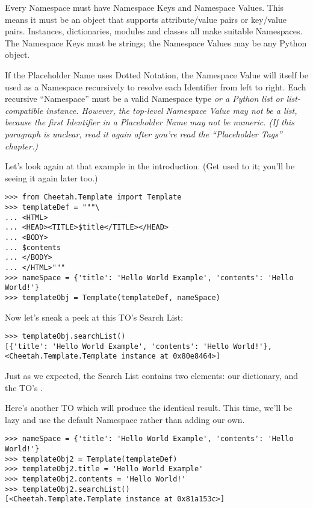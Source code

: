 
Every Namespace must have Namespace Keys and Namespace Values.  This means it
must be an object that supports attribute/value pairs or key/value pairs.  
Instances, dictionaries, modules and classes all make suitable Namespaces.
The Namespace Keys must be strings; the Namespace Values may be any Python
object.

If the Placeholder Name uses Dotted Notation, the Namespace Value will itself
be used as a Namespace recursively to resolve each Identifier from left to 
right.  Each recursive ``Namespace'' must be a valid Namespace type 
\em{or} a Python list or list-compatible instance.  However, the top-level
Namespace Value may \em{not} be a list, because the first Identifier in a
Placeholder Name may not be numeric.  (If this paragraph is unclear, read it
again after you're read the ``Placeholder Tags'' chapter.)

Let's look again at that example in the introduction.  (Get used to it; you'll
be seeing it again later too.)

\begin{verbatim}
>>> from Cheetah.Template import Template
>>> templateDef = """\
... <HTML>
... <HEAD><TITLE>$title</TITLE></HEAD>
... <BODY>
... $contents
... </BODY>
... </HTML>"""
>>> nameSpace = {'title': 'Hello World Example', 'contents': 'Hello World!'}
>>> templateObj = Template(templateDef, nameSpace)
\end{verbatim}

Now let's sneak a peek at this TO's Search List:

\begin{verbatim}
>>> templateObj.searchList()
[{'title': 'Hello World Example', 'contents': 'Hello World!'}, 
<Cheetah.Template.Template instance at 0x80e8464>]
\end{verbatim}

Just as we expected, the Search List contains two elements: our 
\code{nameSpace} dictionary, and the TO's \code{self}.

Here's another TO which will produce the identical result.  This time, we'll be
lazy and use the default Namespace rather than adding our own.

\begin{verbatim}
>>> nameSpace = {'title': 'Hello World Example', 'contents': 'Hello World!'}
>>> templateObj2 = Template(templateDef)
>>> templateObj2.title = 'Hello World Example'
>>> templateObj2.contents = 'Hello World!'
>>> templateObj2.searchList()
[<Cheetah.Template.Template instance at 0x81a153c>]
\end{verbatim}

